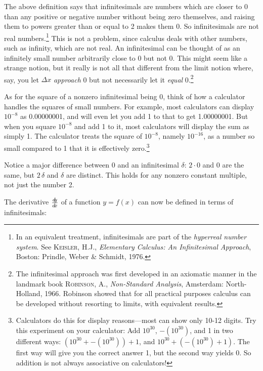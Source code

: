 The above definition says that infinitesimals are numbers which are closer to 0
than any positive or negative number without being zero themselves, and
raising them to powers greater than or equal to 2 makes them 0. So infinitesimals
are not real numbers.\footnote{In an equivalent treatment, infinitesimals are
part of the \emph{hyperreal number system}. See \textsc{Keisler, H.J.},
\emph{Elementary Calculus: An Infinitesimal Approach}, Boston: Prindle, Weber
\& Schmidt, 1976.} This is not a problem, since calculus deals
with other numbers, such as infinity, which are not real. An infinitesimal can
be thought of as an infinitely small number arbitrarily close to 0 but
not 0.
\newpage
This might seem like a strange notion, but it really is not all that
different from the limit notion where, say, you let $\Delta x$ \emph{approach} 0
but not necessarily let it \emph{equal} 0.\footnote{The infinitesimal approach
was first developed in an
axiomatic manner in the landmark book \textsc{Robinson, A.},
\emph{Non-Standard Analysis}, Amsterdam: North-Holland, 1966. Robinson showed
that for all practical purposes calculus can be developed without resorting to
limits, with equivalent results.}

As for the square of a nonzero infinitesimal being 0, think of how a calculator
handles the squares of small numbers. For example, most calculators can display
$10^{-8}$ as 0.00000001, and will even let you add 1 to that to get
1.00000001. But when you square $10^{-8}$ and add 1 to it, most calculators will
display the sum as simply 1. The calculator treats the square of $10^{-8}$,
namely $10^{-16}$, as a number so small compared to 1 that it is
effectively zero.\footnote{Calculators do this for display reasons---most
can show only 10-12 digits. Try this experiment on your
calculator: Add $10^{30}$, $-\left(10^{30}\right)$, and 1 in two different
ways: $\left(10^{30} + -\left(10^{30}\right)\right) + 1$, and $10^{30} +
\left(-\left(10^{30}\right) + 1\right)$. The first way will give you the correct
answer 1, but the second way yields 0.
So addition is not always associative on calculators!}

Notice a major difference between 0 and an infinitesimal $\delta$: $2 \cdot 0$
and $0$ are the same, but $2\,\delta$ and $\delta$ are distinct. This holds for
any nonzero constant multiple, not just the number 2.

The derivative $\frac{d\negmedspace y}{d\!x}$ of a function $y=f(x)$ can now be defined in terms of
infinitesimals:


